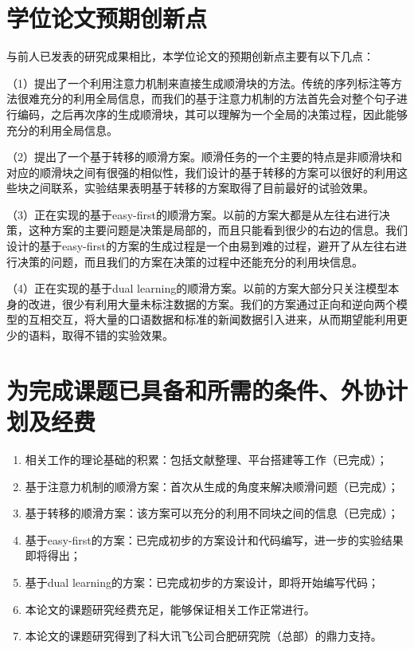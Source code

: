\section{学位论文预期创新点}
与前人已发表的研究成果相比，本学位论文的预期创新点主要有以下几点：

（1）提出了一个利用注意力机制来直接生成顺滑块的方法。传统的序列标注等方法很难充分的利用全局信息，而我们的基于注意力机制的方法首先会对整个句子进行编码，之后再次序的生成顺滑块，其可以理解为一个全局的决策过程，因此能够充分的利用全局信息。

（2）提出了一个基于转移的顺滑方案。顺滑任务的一个主要的特点是非顺滑块和对应的顺滑块之间有很强的相似性，我们设计的基于转移的方案可以很好的利用这些块之间联系，实验结果表明基于转移的方案取得了目前最好的试验效果。

（3）正在实现的基于easy-first的顺滑方案。以前的方案大都是从左往右进行决策，这种方案的主要问题是决策是局部的，而且只能看到很少的右边的信息。我们设计的基于easy-first的方案的生成过程是一个由易到难的过程，避开了从左往右进行决策的问题，而且我们的方案在决策的过程中还能充分的利用块信息。

（4）正在实现的基于dual learning的顺滑方案。以前的方案大部分只关注模型本身的改进，很少有利用大量未标注数据的方案。我们的方案通过正向和逆向两个模型的互相交互，将大量的口语数据和标准的新闻数据引入进来，从而期望能利用更少的语料，取得不错的实验效果。


\section{为完成课题已具备和所需的条件、外协计划及经费}
\begin{enumerate}
	\item 相关工作的理论基础的积累：包括文献整理、平台搭建等工作（已完成）；
	\item 基于注意力机制的顺滑方案：首次从生成的角度来解决顺滑问题（已完成）；
	\item 基于转移的顺滑方案：该方案可以充分的利用不同块之间的信息（已完成）；
	\item 基于easy-first的方案：已完成初步的方案设计和代码编写，进一步的实验结果即将得出；
	\item 基于dual learning的方案：已完成初步的方案设计，即将开始编写代码；
	\item 本论文的课题研究经费充足，能够保证相关工作正常进行。
	\item 本论文的课题研究得到了科大讯飞公司合肥研究院（总部）的鼎力支持。
\end{enumerate}


